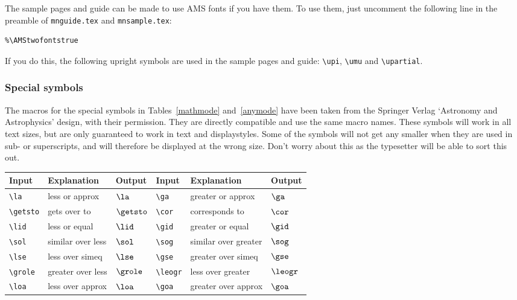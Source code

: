 The sample pages and guide can be made to use AMS fonts if you have them.
To use them, just uncomment the following line in the preamble
of \verb|mnguide.tex| and \verb|mnsample.tex|:
%
\begin{verbatim}
%\AMStwofontstrue
\end{verbatim}
%
If you do this, the following upright symbols are used in the
sample pages and guide: \verb|\upi|, \verb|\umu| and \verb|\upartial|.


\subsubsection{Special symbols}\label{SVsymbols}

The macros for the special symbols in Tables~\ref{mathmode} and~\ref{anymode}
have been taken from the Springer Verlag `Astronomy and Astrophysics' 
design, with their permission. They are directly compatible and use the 
same macro names.
These symbols will work in all text sizes, but are only guaranteed to work
in text and displaystyles. Some of the symbols will not get any smaller when
they are used in sub- or superscripts, and will therefore be displayed at the
wrong size. Don't worry about this as the typesetter will be able to sort
this out.
%
\begin{table*}
\begin{minipage}{110mm}
\caption{Special symbols which can only be used in math mode.}
\label{mathmode}
\begin{tabular}{@{}llllll}
Input & Explanation & Output & Input & Explanation & Output\\
\hline
\verb"\la"     & less or approx       & $\la$     &
  \verb"\ga"     & greater or approx    & $\ga$\\[2pt]
\verb"\getsto" & gets over to         & $\getsto$ &
  \verb"\cor"    & corresponds to       & $\cor$\\[2pt]
\verb"\lid"    & less or equal        & $\lid$    &
  \verb"\gid"    & greater or equal     & $\gid$\\[2pt]
\verb"\sol"    & similar over less    & $\sol$    &
  \verb"\sog"    & similar over greater & $\sog$\\[2pt]
\verb"\lse"    & less over simeq      & $\lse$    &
  \verb"\gse"    & greater over simeq   & $\gse$\\[2pt]
\verb"\grole"  & greater over less    & $\grole$  &
  \verb"\leogr"  & less over greater    & $\leogr$\\[2pt]
\verb"\loa"    & less over approx     & $\loa$    &
  \verb"\goa"    & greater over approx  & $\goa$\\
\hline
\end{tabular}
\end{minipage}
\end{table*}
